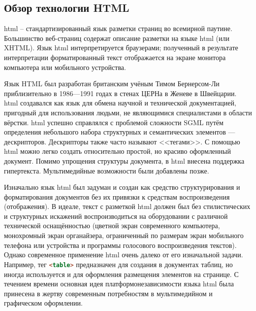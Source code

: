 \subsection{Обзор технологии HTML}

\gls{html} -- стандартизированный язык разметки страниц во всемирной паутине. Большинство веб-страниц содержат описание разметки на языке \gls{html} (или XHTML). Язык \gls{html} интерпретируется браузерами; полученный в результате интерпретации форматированный текст отображается на экране монитора компьютера или мобильного устройства.

Язык HTML был разработан британским учёным Тимом Бернерсом-Ли приблизительно в 1986—1991 годах в стенах ЦЕРНа в Женеве в Швейцарии. \gls{html} создавался как язык для обмена научной и технической документацией, пригодный для использования людьми, не являющимися специалистами в области вёрстки. \gls{html} успешно справлялся с проблемой сложности SGML путём определения небольшого набора структурных и семантических элементов — дескрипторов. Дескрипторы также часто называют <<тегами>>. С помощью \gls{html} можно легко создать относительно простой, но красиво оформленный документ. Помимо упрощения структуры документа, в \gls{html} внесена поддержка гипертекста. Мультимедийные возможности были добавлены позже.

Изначально язык \gls{html} был задуман и создан как средство структурирования и форматирования документов без их привязки к средствам воспроизведения (отображения). В идеале, текст с разметкой \gls{html} должен был без стилистических и структурных искажений воспроизводиться на оборудовании с различной технической оснащённостью (цветной экран современного компьютера, монохромный экран органайзера, ограниченный по размерам экран мобильного телефона или устройства и программы голосового воспроизведения текстов). Однако современное применение \gls{html} очень далеко от его изначальной задачи. Например, тег \lstinline[language=HTML]{<table>} предназначен для создания в документах таблиц, но иногда используется и для оформления размещения элементов на странице. С течением времени основная идея платформонезависимости языка \gls{html} была принесена в жертву современным потребностям в мультимедийном и графическом оформлении.